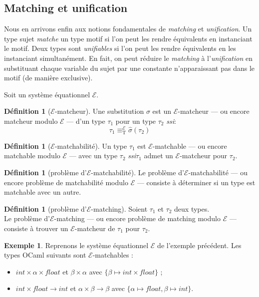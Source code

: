 \documentclass[a4paper]{report}
\theoremstyle{definition}
\newtheorem{definition}[theoreme]{Définition}
\newtheorem{exemple}[theoreme]{Exemple}
\newcommand{\ssi}{\textit{ssi}\xspace}
\newcommand{\E}{\mathscr{E}}
\newcommand{\T}{\mathrm{T}}
\begin{document}

\subsection{Matching et unification}

Nous en arrivons enfin aux notions fondamentales de \emph{matching} et \emph{unification}. Un type sujet \emph{matche} un type motif si l'on peut les rendre équivalents en instanciant le motif. Deux types sont \emph{unifiables} si l'on peut les rendre équivalents en les instanciant simultanément. En fait, on peut réduire le \emph{matching} à l'\emph{unification} en substituant chaque variable du sujet par une constante n'apparaissant pas dans le motif (de manière exclusive).

Soit un système équationnel $\E$.

\begin{definition}[$\E$-matcheur]
	Une substitution $\sigma$ est un $\E$-matcheur — ou encore matcheur modulo $\E$ — d'un type $\tau_1$ pour un type $\tau_2$ \ssi :
	\[ \tau_1 \equiv_\T^\E \hat\sigma (\tau_2) \]
\end{definition}

\begin{definition}[$\E$-matchabilité]
	Un type $\tau_1$ est $\E$-matchable — ou encore matchable modulo $\E$ — avec un type $\tau_2$ \ssi $\tau_1$ admet un $\E$-matcheur pour $\tau_2$.
\end{definition}

\begin{definition}[problème d'$\E$-matchabilité]
	Le problème d'$\E$-matchabilité — ou encore problème de matchabilité modulo $\E$ — consiste à déterminer si un type est matchable avec un autre.
\end{definition}

\begin{definition}[problème d'$\E$-matching]
	Soient $\tau_1$ et $\tau_2$ deux types. \\
	Le problème d'$\E$-matching — ou encore problème de matching modulo $\E$ — consiste à trouver un $\E$-matcheur de $\tau_1$ pour $\tau_2$.
\end{definition}

\begin{exemple}
	Reprenons le système équationnel $\E$ de l'exemple précédent. Les types OCaml suivants sont $\E$-matchables :
	\begin{itemize}
		\item $int \times \alpha \times float$ et $\beta \times \alpha$ avec $\{ \beta \mapsto int \times float \}$ ;
		\item $int \times float \rightarrow int$ et $\alpha \times \beta \rightarrow \beta$ avec $\{ \alpha \mapsto float, \beta \mapsto int \}$.
	\end{itemize}
\end{exemple}
\end{document}
